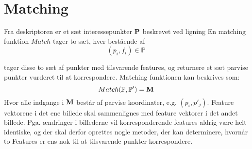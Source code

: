 \section{Matching}
Fra deskriptoren er et sæt interessepunkter $\bold{P}$ beskrevet ved ligning 
En matching funktion $Match$ tager to sæt, hver bestående af 
$$ (p_i,f_i) \in \mathbb{P} $$


 tager disse to sæt af punkter med tilsvarende features, og returnere et sæt parvise punkter vurderet til at korrespondere. Matching funktionen kan beskrives som:
\begin{equation}
Match(\mathbb{P}, \mathbb{P}') = \bold{M}
\end{equation}
Hvor alle indgange i $\bold{M}$ består af parvise koordinater, e.g. $(p_i, p'_j)$. Feature vektorene i det ene billede skal sammenlignes med feature vektorer i det andet billede. Pga. ændringer i billederne vil korresponderende features aldrig være helt identiske, og der skal derfor oprettes nogle metoder, der kan determinere, hvornår to Features er ens nok til at tilsvarende punkter korrespondere.